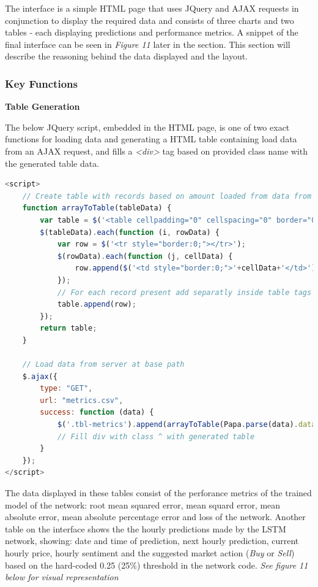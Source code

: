 \documentclass[oneside, 12pt]{article}
\begin{document}
		The interface is a simple HTML page that uses JQuery and AJAX requests in conjunction to display the required data and consists of three charts and two tables - each displaying predictions and performance metrics. A snippet of the final interface can be seen in \textit{Figure 11} later in the section. This section will describe the reasoning behind the data displayed and the layout.
		
		\subsubsection{Key Functions}
		
		\textbf{Table Generation}
		
		The below JQuery script, embedded in the HTML page, is one of two exact functions for loading data and generating a HTML table containing load data from an AJAX request, and fills a \textit{<div>} tag based on provided class name with the generated table data.  
		
		\begin{lstlisting}[language=JavaScript, caption=AJAX request and plotting performance data to HTML table]
<script>
	// Create table with records based on amount loaded from data from AJAX request
	function arrayToTable(tableData) {
		var table = $('<table cellpadding="0" cellspacing="0" border="0"></table');
		$(tableData).each(function (i, rowData) {
			var row = $('<tr style="border:0;"></tr>');
			$(rowData).each(function (j, cellData) {
				row.append($('<td style="border:0;">'+cellData+'</td>'));
			});
			// For each record present add separatly inside table tags
			table.append(row);
		});
		return table;
	}
	
	// Load data from server at base path
	$.ajax({
		type: "GET",
		url: "metrics.csv",
		success: function (data) {
			$('.tbl-metrics').append(arrayToTable(Papa.parse(data).data));
			// Fill div with class ^ with generated table
		}
	});
</script>
		\end{lstlisting}
		
		The data displayed in these tables consist of the perforance metrics of the trained model of the network: root mean squared error, mean squard error, mean absolute error, mean absolute percentage error and loss of the network. Another table on the interface shows the the hourly predictions made by the LSTM network, showing: date and time of prediction, next hourly prediction, current hourly price, hourly sentiment and the suggested market action (\textit{Buy} or \textit{Sell}) based on the hard-coded 0.25 (25\%) threshold in the network code. \textit{See figure 11 below for visual representation}
\newline
\end{document}
